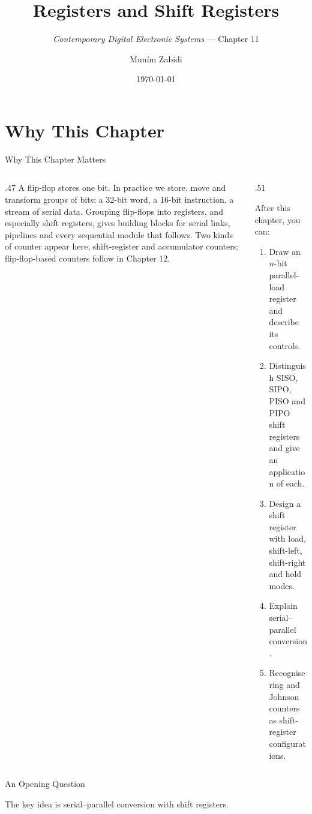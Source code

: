 \documentclass[9pt,aspectratio=169,xcolor=table]{beamer}
\title{Registers and Shift Registers}
\subtitle{\emph{Contemporary Digital Electronic Systems} --- Chapter 11}
\author{Mun\'{i}m Zabidi}
\institute{\color{primary}Faculty of Electrical Engineering, Universiti Teknologi Malaysia}
\date{\today}
\begin{document}
\titlepage

\section{Why This Chapter}

\begin{frame}{Why This Chapter Matters}
  \begin{columns}[c]
  \begin{column}{.47\textwidth}
    A flip-flop stores one bit. In practice we store, move and transform groups of bits: a 32-bit word, a 16-bit instruction, a stream of serial data. Grouping flip-flops into \alert{registers}, and especially \alert{shift registers}, gives building blocks for serial links, pipelines and every sequential module that follows. Two kinds of counter appear here, shift-register and accumulator counters; flip-flop-based counters follow in Chapter 12.
  \end{column}
  \begin{column}{.51\textwidth}
    \begin{block}{After this chapter, you can:}
    {\small
    \begin{enumerate}\itemsep2pt
      \item Draw an $n$-bit parallel-load register and describe its controls.
      \item Distinguish SISO, SIPO, PISO and PIPO shift registers and give an application of each.
      \item Design a shift register with load, shift-left, shift-right and hold modes.
      \item Explain serial--parallel conversion.
      \item Recognise ring and Johnson counters as shift-register configurations.
    \end{enumerate}}
    \end{block}
  \end{column}
  \end{columns}
\end{frame}

\begin{frame}{An Opening Question}
  \leavevmode\vspace{4mm}
  \begin{center}
  \end{center}
  \vspace{4mm}
  The key idea is \alert{serial--parallel conversion} with shift registers.
\end{frame}
\end{document}
